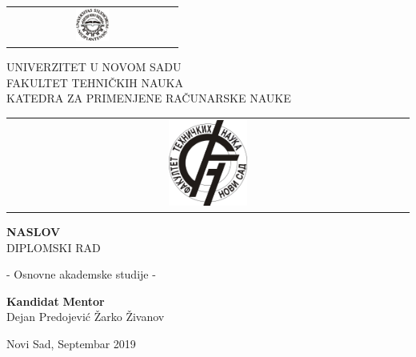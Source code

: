 \begin{titlepage}
\begin{tabular}{@{}c@{}}
\includegraphics[width=0.2\textwidth]{img/uns.jpg}
\end{tabular}
\begin{minipage}[c]{0.6\textwidth}
\centering
UNIVERZITET U NOVOM SADU\\
FAKULTET TEHNIČKIH NAUKA\\
KATEDRA ZA PRIMENJENE RAČUNARSKE NAUKE
\end{minipage}
\begin{tabular}{@{}c@{}}
\includegraphics[width=0.2\textwidth]{img/ftn.jpg}
\end{tabular}

\vspace*{\fill}
\centering
{\Large \bf NASLOV}\\
DIPLOMSKI RAD

- Osnovne akademske studije -
\\
\vspace*{\fill}

\textbf{Kandidat}
\hfill
\textbf{Mentor} \\
Dejan Predojević
\hfill
Žarko Živanov

Novi Sad, Septembar 2019

\end{titlepage}